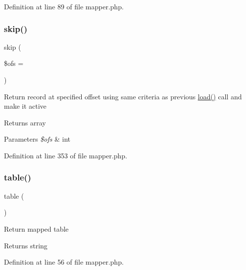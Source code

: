 Definition at line 89 of file mapper.\+php.

\hypertarget{class_d_b_1_1_s_q_l_1_1_mapper_aad399d205074eaeed711d5e0157b3c0a}{}\label{class_d_b_1_1_s_q_l_1_1_mapper_aad399d205074eaeed711d5e0157b3c0a} 
\subsubsection{\texorpdfstring{skip()}{skip()}}
{\footnotesize\ttfamily skip (\begin{DoxyParamCaption}\item[{}]{\$ofs = {} }\end{DoxyParamCaption})}

Return record at specified offset using same criteria as previous \hyperlink{class_d_b_1_1_cursor_a4db66c122e6274a3d653eff639e8476f}{load()} call and make it active \begin{DoxyReturn}{Returns}
array 
\end{DoxyReturn}

\begin{DoxyParams}{Parameters}
{\em \$ofs} & int \\
\hline
\end{DoxyParams}


Definition at line 353 of file mapper.\+php.

\hypertarget{class_d_b_1_1_s_q_l_1_1_mapper_a5aa7b43c8ec77df216a71a27da0a321c}{}\label{class_d_b_1_1_s_q_l_1_1_mapper_a5aa7b43c8ec77df216a71a27da0a321c} 
\subsubsection{\texorpdfstring{table()}{table()}}
{\footnotesize\ttfamily table (\begin{DoxyParamCaption}{ }\end{DoxyParamCaption})}

Return mapped table \begin{DoxyReturn}{Returns}
string 
\end{DoxyReturn}


Definition at line 56 of file mapper.\+php.

\hypertarget{class_d_b_1_1_s_q_l_1_1_mapper_ab141334dd0647184bad274f4794b2387}{}\label{class_d_b_1_1_s_q_l_1_1_mapper_ab141334dd0647184bad274f4794b2387} 
